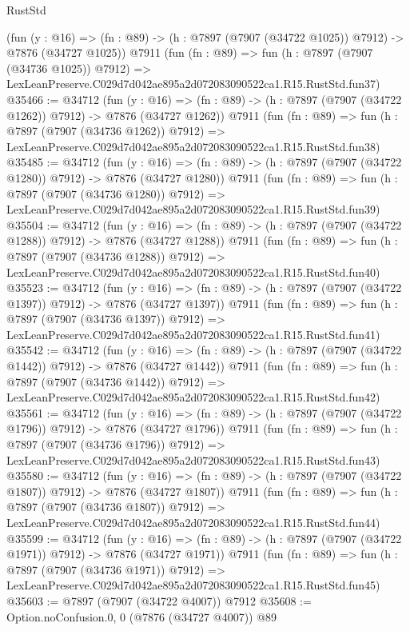\begin{lexlean}{RustStd}
\begin{coremodule}
    (fun (y : @16) =>
    (fn : @89) -> (h : @7897 (@7907 (@34722 @1025)) @7912) -> @7876 (@34727 @1025))
    @7911
    (fun (fn : @89) =>
    fun (h : @7897 (@7907 (@34736 @1025)) @7912) =>
    LexLeanPreserve.C029d7d042ae895a2d072083090522ca1.R15.RustStd.fun37)
@35466 := @34712
    (fun (y : @16) =>
    (fn : @89) -> (h : @7897 (@7907 (@34722 @1262)) @7912) -> @7876 (@34727 @1262))
    @7911
    (fun (fn : @89) =>
    fun (h : @7897 (@7907 (@34736 @1262)) @7912) =>
    LexLeanPreserve.C029d7d042ae895a2d072083090522ca1.R15.RustStd.fun38)
@35485 := @34712
    (fun (y : @16) =>
    (fn : @89) -> (h : @7897 (@7907 (@34722 @1280)) @7912) -> @7876 (@34727 @1280))
    @7911
    (fun (fn : @89) =>
    fun (h : @7897 (@7907 (@34736 @1280)) @7912) =>
    LexLeanPreserve.C029d7d042ae895a2d072083090522ca1.R15.RustStd.fun39)
@35504 := @34712
    (fun (y : @16) =>
    (fn : @89) -> (h : @7897 (@7907 (@34722 @1288)) @7912) -> @7876 (@34727 @1288))
    @7911
    (fun (fn : @89) =>
    fun (h : @7897 (@7907 (@34736 @1288)) @7912) =>
    LexLeanPreserve.C029d7d042ae895a2d072083090522ca1.R15.RustStd.fun40)
@35523 := @34712
    (fun (y : @16) =>
    (fn : @89) -> (h : @7897 (@7907 (@34722 @1397)) @7912) -> @7876 (@34727 @1397))
    @7911
    (fun (fn : @89) =>
    fun (h : @7897 (@7907 (@34736 @1397)) @7912) =>
    LexLeanPreserve.C029d7d042ae895a2d072083090522ca1.R15.RustStd.fun41)
@35542 := @34712
    (fun (y : @16) =>
    (fn : @89) -> (h : @7897 (@7907 (@34722 @1442)) @7912) -> @7876 (@34727 @1442))
    @7911
    (fun (fn : @89) =>
    fun (h : @7897 (@7907 (@34736 @1442)) @7912) =>
    LexLeanPreserve.C029d7d042ae895a2d072083090522ca1.R15.RustStd.fun42)
@35561 := @34712
    (fun (y : @16) =>
    (fn : @89) -> (h : @7897 (@7907 (@34722 @1796)) @7912) -> @7876 (@34727 @1796))
    @7911
    (fun (fn : @89) =>
    fun (h : @7897 (@7907 (@34736 @1796)) @7912) =>
    LexLeanPreserve.C029d7d042ae895a2d072083090522ca1.R15.RustStd.fun43)
@35580 := @34712
    (fun (y : @16) =>
    (fn : @89) -> (h : @7897 (@7907 (@34722 @1807)) @7912) -> @7876 (@34727 @1807))
    @7911
    (fun (fn : @89) =>
    fun (h : @7897 (@7907 (@34736 @1807)) @7912) =>
    LexLeanPreserve.C029d7d042ae895a2d072083090522ca1.R15.RustStd.fun44)
@35599 := @34712
    (fun (y : @16) =>
    (fn : @89) -> (h : @7897 (@7907 (@34722 @1971)) @7912) -> @7876 (@34727 @1971))
    @7911
    (fun (fn : @89) =>
    fun (h : @7897 (@7907 (@34736 @1971)) @7912) =>
    LexLeanPreserve.C029d7d042ae895a2d072083090522ca1.R15.RustStd.fun45)
@35603 := @7897 (@7907 (@34722 @4007)) @7912
@35608 := Option.noConfusion.{0, 0} (@7876 (@34727 @4007)) @89

\end{coremodule}
\end{lexlean}
